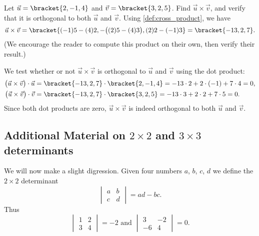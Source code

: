 \begin{example}\label{ex_crossp1}%
Let $\vec u = \bracket{2,-1,4}$ and $\vec v = \bracket{3,2,5}$. Find $\vec u\times\vec v$, and verify that it is orthogonal to both $\vec u$ and $\vec v$.
\solution
Using \autoref{def:cross_product}, we have
\[
\vec u\times\vec v = \bracket{(-1)5-(4)2,-\bigl((2)5-(4)3\bigr), (2)2-(-1)3}=\bracket{-13,2,7}.
\] 
(We encourage the reader to compute this product on their own, then verify their result.)

We test whether or not $\vec u\times\vec v$ is orthogonal to $\vec u$ and $\vec v$ using the dot product:
\begin{align*}
\bigl(\vec u\times\vec v\bigr) \cdot \vec u
 &=\bracket{-13,2,7}\cdot\bracket{2,-1,4}=-13\cdot2+2\cdot(-1)+7\cdot4=0, \\
\bigl(\vec u\times\vec v\bigr) \cdot \vec v
 &=\bracket{-13,2,7}\cdot\bracket{3,2,5}=-13\cdot3+2\cdot2+7\cdot5=0.
\end{align*}
Since both dot products are zero, $\vec u\times\vec v$ is indeed orthogonal to both $\vec u$ and $\vec v$.
\end{example}

\subsection{Additional Material on \texorpdfstring{$2\times2$ and $3\times3$}{2x2 and 3x3} determinants}

We will now make a slight digression.  Given four numbers $a$, $b$, $c$, $d$ we define the $2 \times 2$ determinant
\[\begin{vmatrix}a & b \\ c & d\end{vmatrix} = ad - bc.\]
Thus
\[
\begin{vmatrix}1 & 2 \\3 & 4\end{vmatrix} = -2
\text{ and }
\begin{vmatrix}3 & -2 \\ -6 & 4\end{vmatrix} = 0.
\]


